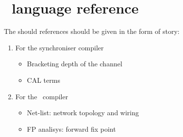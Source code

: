 \chapter{\ak\ language reference}
The should references should be given in the form of story:
\begin{enumerate}
\item For the synchroniser compiler
  \begin{itemize}
  \item Bracketing depth of the channel
  \item CAL terms

  \end{itemize}
  
\item For the \ak\ compiler
  \begin{itemize}
  \item Net-list: network topology and wiring
  \item FP analisys: forward fix point
  \end{itemize}

\end{enumerate}
